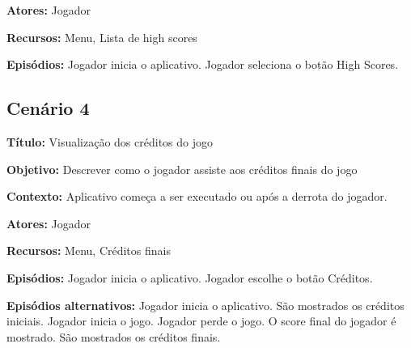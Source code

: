 \textbf{Atores:} Jogador

\textbf{Recursos:} Menu, Lista de high scores

\textbf{Episódios:} Jogador inicia o aplicativo. Jogador seleciona o botão High Scores. 

\subsection{Cenário 4}

\textbf{Título:} Visualização dos créditos do jogo

\textbf{Objetivo:} Descrever como o jogador assiste aos créditos finais do jogo

\textbf{Contexto:} Aplicativo começa a ser executado ou após a derrota do jogador.

\textbf{Atores:} Jogador

\textbf{Recursos:} Menu, Créditos finais

\textbf{Episódios:} Jogador inicia o aplicativo. Jogador escolhe o botão Créditos.

\textbf{Episódios alternativos:} Jogador inicia o aplicativo. São mostrados os créditos iniciais. Jogador inicia o jogo. Jogador perde o jogo. O score final do jogador é mostrado. São mostrados os créditos finais.

